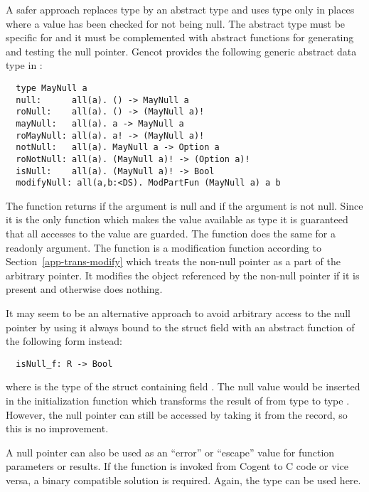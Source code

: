 A safer approach replaces type  by an abstract type and uses type  only in places where a value has been checked
for not being null. The abstract type must be specific for  and it must be complemented with abstract functions for
generating and testing the null pointer. Gencot provides the following generic abstract data type in :
\begin{verbatim}
  type MayNull a 
  null:      all(a). () -> MayNull a
  roNull:    all(a). () -> (MayNull a)!
  mayNull:   all(a). a -> MayNull a
  roMayNull: all(a). a! -> (MayNull a)!
  notNull:   all(a). MayNull a -> Option a
  roNotNull: all(a). (MayNull a)! -> (Option a)!
  isNull:    all(a). (MayNull a)! -> Bool
  modifyNull: all(a,b:<DS). ModPartFun (MayNull a) a b
\end{verbatim}
The function  returns  if the argument is null and  if the argument  is not null.
Since it is the only function which makes the value available as type  it is guaranteed that all accesses to the value
are guarded. The function  does the same for a readonly argument. The function  is a 
modification function according to Section~\ref{app-trans-modify} which treats the non-null pointer as a part of the 
arbitrary pointer. It modifies the object referenced by the non-null pointer if it is present and otherwise does nothing.

It may seem to be an alternative approach to avoid arbitrary access to the null pointer by using it always bound to the struct field 
with an abstract function of the following form instead:
\begin{verbatim}
  isNull_f: R -> Bool
\end{verbatim}
where  is the type of the struct containing field . The null value would be inserted in the initialization 
function which transforms the result of  from type  to type . However, the null 
pointer can still be accessed by taking it from the record, so this is no improvement.

A null pointer can also be used as an ``error'' or ``escape'' value for function parameters or results. If the function is
invoked from Cogent to C code or vice versa, a binary compatible solution is required. Again, the type  can
be used here.

